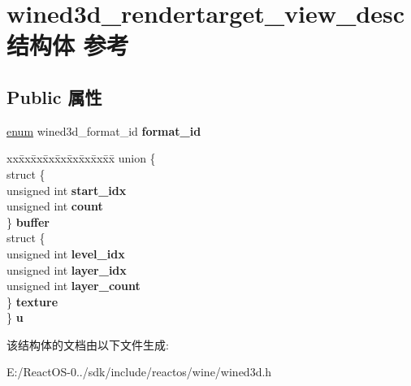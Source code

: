 \hypertarget{structwined3d__rendertarget__view__desc}{}\section{wined3d\+\_\+rendertarget\+\_\+view\+\_\+desc结构体 参考}
\label{structwined3d__rendertarget__view__desc}
\subsection*{Public 属性}
\begin{DoxyCompactItemize}
\item 
\mbox{\label{structwined3d__rendertarget__view__desc_aeda3763d2dd6472aa8b2e11350053842}} 
\hyperlink{interfaceenum}{enum} wined3d\+\_\+format\+\_\+id {\bfseries format\+\_\+id}
\item 
\mbox{\label{structwined3d__rendertarget__view__desc_a54f784144e252df749b2393a4ed81b3f}} 
\begin{tabbing}
xx\=xx\=xx\=xx\=xx\=xx\=xx\=xx\=xx\=\kill
union \{\\
\>struct \{\\
\>\>unsigned int {\bfseries start\_idx}\\
\>\>unsigned int {\bfseries count}\\
\>\} {\bfseries buffer}\\
\>struct \{\\
\>\>unsigned int {\bfseries level\_idx}\\
\>\>unsigned int {\bfseries layer\_idx}\\
\>\>unsigned int {\bfseries layer\_count}\\
\>\} {\bfseries texture}\\
\} {\bfseries u}\\

\end{tabbing}\end{DoxyCompactItemize}


该结构体的文档由以下文件生成\+:\begin{DoxyCompactItemize}
\item 
E\+:/\+React\+O\+S-\/0../sdk/include/reactos/wine/wined3d.\+h\end{DoxyCompactItemize}

